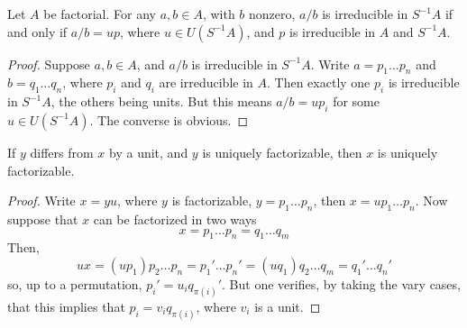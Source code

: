 \begin{lemma}
    Let $A$ be factorial. For any $a,b \in A$, with $b$ nonzero, $a/b$ is irreducible in $S^{-1}A$ if and only if $a/b = up$, where $u \in U(S^{-1}A)$, and $p$ is irreducible in $A$ and $S^{-1}A$.
\end{lemma}
\begin{proof}
    Suppose $a,b \in A$, and $a/b$ is irreducible in $S^{-1}A$. Write $a = p_1 \dots p_n$ and $b = q_1 \dots q_n$, where $p_i$ and $q_i$ are irreducible in $A$. Then exactly one $p_i$ is irreducible in $S^{-1}A$, the others being units. But this means $a/b = up_i$ for some $u \in U(S^{-1}A)$. The converse is obvious.
\end{proof}

\begin{lemma}
    If $y$ differs from $x$ by a unit, and $y$ is uniquely factorizable, then $x$ is uniquely factorizable.
\end{lemma}
\begin{proof}
    Write $x = yu$, where $y$ is factorizable, $y = p_1 \dots p_n$, then $x = u p_1 \dots p_n$. Now suppose that $x$ can be factorized in two ways
    \[ x = p_1 \dots p_n = q_1 \dots q_m \]
    Then,
    \[ ux = (up_1) p_2 \dots p_n = p_1' \dots p_n' = (uq_1) q_2 \dots q_m = q_1' \dots q_n' \]
    so, up to a permutation, $p_i' = u_i q_{\pi(i)}'$. But one verifies, by taking the vary cases, that this implies that $p_i = v_i q_{\pi(i)}$, where $v_i$ is a unit.
\end{proof}

